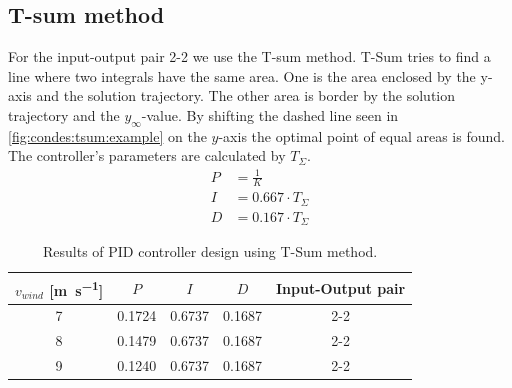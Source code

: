\subsection{T-sum method} \label{sec:condes:Tsum}

For the input-output pair 2-2 we use the T-sum method.
T-Sum tries to find a line where two integrals have the same area. 
One is the area enclosed by the y-axis and the solution trajectory.
The other area is border by the solution trajectory and the $y_{\infty}$-value.
By shifting the dashed line seen in \autoref{fig:condes:tsum:example} on the $y$-axis the optimal point of equal areas is found.
The controller's parameters are calculated by $T_{\Sigma}$.
\begin{align}
    P &= \frac{1}{K} \\
    I &= 0.667 \cdot T_{\Sigma} \\
    D &= 0.167 \cdot T_{\Sigma}
\end{align}

\begin{table}[H]
    \caption{Results of PID controller design using T-Sum method.}
    \centering
    \begin{tabular}{ccccc} \toprule
        $v_{wind}$ [\si{\metre\per\second}] &$P$ & $I$ & $D$ & Input-Output pair \\ \midrule
        7 & 0.1724 & 0.6737 & 0.1687 & 2-2 \\
        8 & 0.1479 & 0.6737 & 0.1687 & 2-2 \\ 
        9 & 0.1240 & 0.6737 & 0.1687 & 2-2 \\ \bottomrule
    \end{tabular}
    \label{tab:condes:tsum:results}
\end{table}

